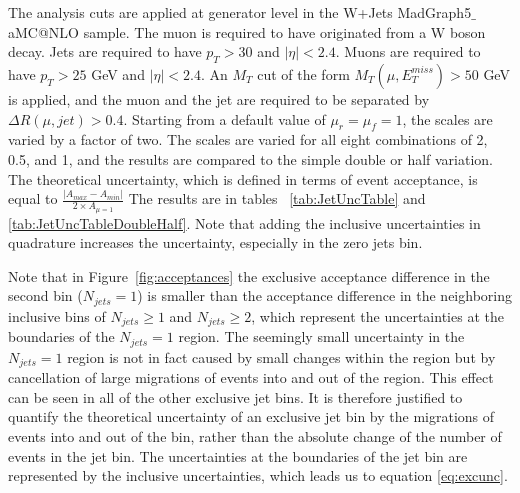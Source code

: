 \documentclass[oneside, letterpaper, oldfontcommands]{memoir}
\begin{document}
\qquad The analysis cuts are applied at generator level in the W+Jets {\sc MadGraph5$\_$aMC@NLO} sample. The muon is required to have originated from a W boson decay. Jets are required to have $p_{T} > 30$ and $|\eta| < 2.4$. Muons are required to have $p_{T} > 25$ GeV and $|\eta| < 2.4$. An $M_{T}$ cut of the form $M_{T}(\mu,E_{T}^{miss}) > 50$ GeV is applied, and the muon and the jet are required to be separated by $\Delta R(\mu,jet) > 0.4$. Starting from a default value of $\mu_{r} = \mu_{f} = 1$, the scales are varied by a factor of two. The scales are varied for all eight combinations of 2, 0.5, and 1, and the results are compared to the simple double or half variation.  The theoretical uncertainty, which is defined in terms of event acceptance, is equal to $\frac{|A_{max} - A_{min}|}{2 \times A_{\mu=1}}$  The results are in tables ~\ref{tab:JetUncTable} and \ref{tab:JetUncTableDoubleHalf}. Note that adding the inclusive uncertainties in quadrature increases the uncertainty, especially in the zero jets bin.

\qquad Note that in Figure~\ref{fig:acceptances} the exclusive acceptance difference in the second bin ($N_{jets}=1$) is smaller than the acceptance difference in the neighboring inclusive bins of $N_{jets} \geq 1$ and $N_{jets} \geq2$, which represent the uncertainties at the boundaries of the $N_{jets}=1$ region. The seemingly small uncertainty in the $N_{jets}=1$ region is not in fact caused by small changes within the region but by cancellation of large migrations of events into and out of the region. This effect can be seen in all of the other exclusive jet bins.
It is therefore justified to quantify the theoretical uncertainty of an exclusive jet bin by the migrations of events into and out of the bin, rather than the absolute change of the number of events in the jet bin. The uncertainties at the boundaries of the jet bin are represented by the inclusive uncertainties, which leads us to equation \eqref{eq:excunc}.
\end{document}
